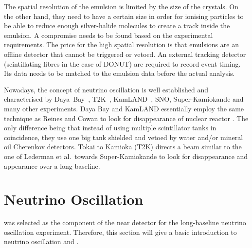 The spatial resolution of the emulsion is limited by the size of the crystals.
On the other hand, they need to have a certain size in order for ionising particles to be able to reduce enough silver-halide molecules to create a track inside the emulsion.
A compromise needs to be found based on the experimental requirements.
The price for the high spatial resolution is that emulsions are an offline detector that cannot be triggered or vetoed.
An external tracking detector (scintillating fibres in the case of DONUT) are required to record event timing.
Its data needs to be matched to the emulsion data before the actual analysis.

Nowadays, the concept of neutrino oscillation is well established and characterised by Daya~Bay~\cite{dayabayRecent}, T2K~\cite{t2kOsc}, KamLAND~\cite{kamland}, SNO, Super-Kamiokande and many other experiments.
Daya Bay and KamLAND essentially employ the same technique as Reines and Cowan to look for disappearance of nuclear reactor \Pagne.
The only difference being that instead of using multiple scintillator tanks in coincidence, they use one big tank shielded and vetoed by water and/or mineral oil Cherenkov detectors.
Tokai to Kamioka (T2K) directs a \Pgngm beam similar to the one of Lederman et al.\ towards Super-Kamiokande to look for \Pgngm disappearance and \Pgne appearance over a long baseline.


\section{Neutrino Oscillation}
\label{sec:nu-detection_osc}

\AC{} was selected as the \lar{} component of the near detector for the \dune{} long-baseline neutrino oscillation experiment.
Therefore, this section will give a basic introduction to neutrino oscillation and \dune{}.

